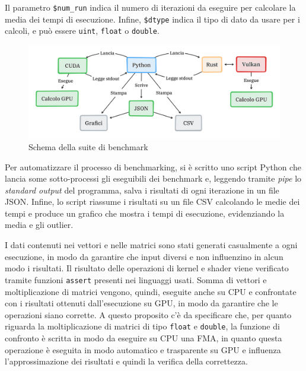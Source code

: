 Il parametro \verb|$num_run| indica il numero di iterazioni da eseguire per calcolare la media dei tempi di esecuzione. Infine, \verb|$dtype| indica il tipo di dato da usare per i calcoli, e può essere \verb|uint|, \verb|float| o \verb|double|.

\begin{figure}[ht]
  \centering
  \includegraphics[width=1\linewidth]{images/chapter4/arch_bench.png}
  \caption{Schema della suite di benchmark}
  \label{fig:arch_bench}
\end{figure}

Per automatizzare il processo di benchmarking, si è scritto uno script Python che lancia some sotto-processi gli eseguibili dei benchmark e, leggendo tramite \textit{pipe} lo \textit{standard output} del programma, salva i risultati di ogni iterazione in un file \gls{JSON}. Infine, lo script riassume i risultati su un file \gls{CSV} calcolando le medie dei tempi e produce un grafico che mostra i tempi di esecuzione, evidenziando la media e gli outlier.


I dati contenuti nei vettori e nelle matrici sono stati generati casualmente a ogni esecuzione, in modo da garantire che input diversi e non influenzino in alcun modo i risultati. Il risultato delle operazioni di kernel e shader viene verificato tramite funzioni \verb|assert| presenti nei linguaggi usati. Somma di vettori e moltiplicazione di matrici vengono, quindi, eseguite anche su \gls{CPU} e confrontate con i risultati ottenuti dall'esecuzione su \gls{GPU}, in modo da garantire che le operazioni siano corrette. A questo proposito c'è da specificare che, per quanto riguarda la moltiplicazione di matrici di tipo \verb|float| e \verb|double|, la funzione di confronto è scritta in modo da eseguire su \gls{CPU} una \gls{FMA}, in quanto questa operazione è eseguita in modo automatico e trasparente su \gls{GPU} e influenza l'approssimazione dei risultati e quindi la verifica della correttezza.

